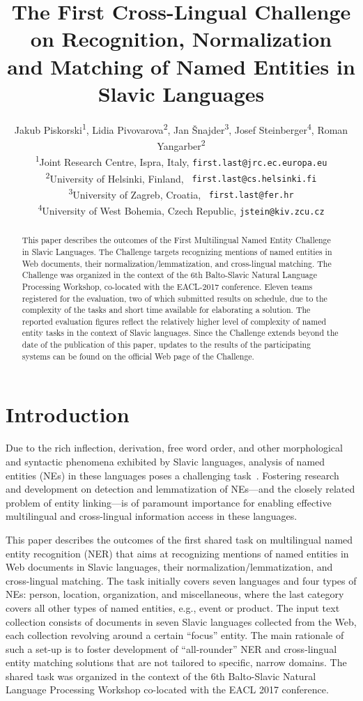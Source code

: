 \documentclass[11pt]{article}
\title{The First Cross-Lingual Challenge on Recognition,
  Normalization
  \\ and Matching of Named Entities in Slavic Languages}
\author{Jakub Piskorski\textsuperscript{1},
  Lidia Pivovarova\textsuperscript{2},
  Jan Šnajder\textsuperscript{3},
  Josef Steinberger\textsuperscript{4},
  Roman Yangarber\textsuperscript{2} \\
  \textsuperscript{1}Joint Research Centre,
  \comment{Via Enrico Fermi 2749, 21027}Ispra\comment{ (VA)}, Italy,
  {\small \tt first.last@jrc.ec.europa.eu} \\
  \textsuperscript{2}University of Helsinki, Finland, {\small \tt
  first.last@cs.helsinki.fi}\\
    \textsuperscript{3}University of Zagreb, Croatia, {\small \tt
    first.last@fer.hr} \\
  \textsuperscript{4}University of West Bohemia, Czech Republic, 
  {\small \tt jstein@kiv.zcu.cz} 
  }
\date{}
\begin{document}
\maketitle
\begin{abstract}

  This paper describes the outcomes of the First Multilingual Named Entity Challenge in Slavic
  Languages.  The Challenge targets recognizing mentions of named entities in Web documents,
  their normalization/lemmatization, and cross-lingual matching.  The Challenge was organized
  in the context of the 6th Balto-Slavic Natural Language Processing Workshop, co-located with
  the EACL-2017 conference.  Eleven teams registered for the evaluation, two of which
  submitted results on schedule, due to the complexity of the tasks and short time available
  for elaborating a solution.  The reported evaluation figures reflect the relatively higher
  level of complexity of named entity tasks in the context of Slavic languages.  Since the
  Challenge extends beyond the date of the publication of this paper, updates to the results
  of the participating systems can be found on the official Web page of the Challenge.

\end{abstract}

\section{Introduction}
\label{sec:intro}

Due to the rich inflection, derivation, free word order, and other morphological and syntactic
phenomena exhibited by Slavic languages, analysis of named entities (NEs) in these languages
poses a challenging
task~\cite{Przepiorkowski:2007:SIE:1567545.1567547,journals/ir/PiskorskiWS09}.  Fostering
research and development on detection and lemmatization of NEs---and the closely related
problem of entity linking---is of paramount importance for enabling effective multilingual and
cross-lingual information access in these languages.

This paper describes the outcomes of the first shared task on multilingual named entity
recognition {(NER)} that aims at recognizing mentions of named entities in Web documents in
Slavic languages, their normalization/lemmatization, and cross-lingual matching.  The task
initially covers seven languages and four types of NEs: person, location, organization, and
miscellaneous, where the last category covers all other types of named entities, e.g., event
or product.  The input text collection consists of documents in {seven Slavic languages}
collected from the Web, each collection revolving around a certain ``focus'' entity.  The main
rationale of such a set-up is to foster development of ``all-rounder'' NER and cross-lingual
entity matching solutions that are not tailored to specific, narrow domains.  The shared task
was organized in the context of the 6th Balto-Slavic Natural Language Processing Workshop
co-located with the EACL 2017 conference.
\end{document}
